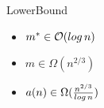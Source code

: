 \begin{frame}{\FrameName}
\begin{block}{LowerBound}
	\begin{center}
	\end{center}
	\begin{itemize}[<+->]
		\item $m^* \in \mathcal{O}(log \thinspace n)$
		\item $m \in \Omega(n^{2/3})$
		\item $a(n) \in \Omega(\frac{n^{2/3}}{log \thinspace n})$
	\end{itemize}
\end{block}
\end{frame}